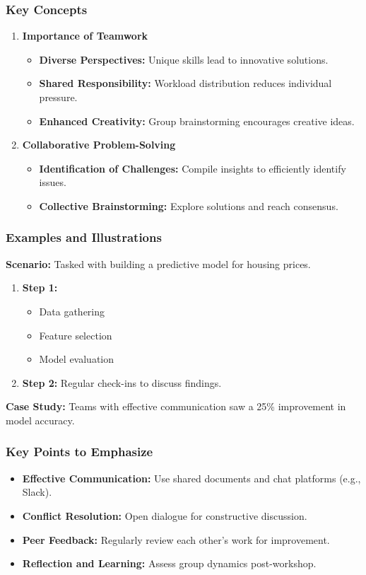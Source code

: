 \documentclass{beamer}
\begin{document}
\begin{frame}[fragile]
    \frametitle{Key Concepts}
    \begin{enumerate}
        \item \textbf{Importance of Teamwork}
            \begin{itemize}
                \item \textbf{Diverse Perspectives:} Unique skills lead to innovative solutions.
                \item \textbf{Shared Responsibility:} Workload distribution reduces individual pressure.
                \item \textbf{Enhanced Creativity:} Group brainstorming encourages creative ideas.
            \end{itemize}
        \item \textbf{Collaborative Problem-Solving}
            \begin{itemize}
                \item \textbf{Identification of Challenges:} Compile insights to efficiently identify issues.
                \item \textbf{Collective Brainstorming:} Explore solutions and reach consensus.
            \end{itemize}
    \end{enumerate}
\end{frame}

\begin{frame}[fragile]
    \frametitle{Examples and Illustrations}
    \textbf{Scenario:} Tasked with building a predictive model for housing prices.
    \begin{enumerate}
        \item \textbf{Step 1:} 
        \begin{itemize}
            \item Data gathering 
            \item Feature selection 
            \item Model evaluation 
        \end{itemize}
        \item \textbf{Step 2:} Regular check-ins to discuss findings.
    \end{enumerate}
    \textbf{Case Study:} Teams with effective communication saw a 25\% improvement in model accuracy.
\end{frame}

\begin{frame}[fragile]
    \frametitle{Key Points to Emphasize}
    \begin{itemize}
        \item \textbf{Effective Communication:} Use shared documents and chat platforms (e.g., Slack).
        \item \textbf{Conflict Resolution:} Open dialogue for constructive discussion.
        \item \textbf{Peer Feedback:} Regularly review each other's work for improvement.
        \item \textbf{Reflection and Learning:} Assess group dynamics post-workshop.
    \end{itemize}
\end{frame}
\end{document}
